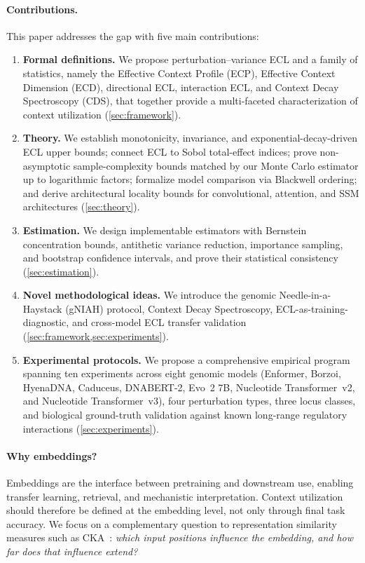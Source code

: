 \paragraph{Contributions.}
This paper addresses the gap with five main contributions:
\begin{enumerate}[leftmargin=2em]
\item \textbf{Formal definitions.} We propose perturbation--variance ECL and a family of statistics, namely the Effective Context Profile (ECP), Effective Context Dimension (ECD), directional ECL, interaction ECL, and Context Decay Spectroscopy (CDS), that together provide a multi-faceted characterization of context utilization (\cref{sec:framework}).
\item \textbf{Theory.} We establish monotonicity, invariance, and exponential-decay-driven ECL upper bounds; connect ECL to Sobol total-effect indices; prove non-asymptotic sample-complexity bounds matched by our Monte Carlo estimator up to logarithmic factors; formalize model comparison via Blackwell ordering; and derive architectural locality bounds for convolutional, attention, and SSM architectures (\cref{sec:theory}).
\item \textbf{Estimation.} We design implementable estimators with Bernstein concentration bounds, antithetic variance reduction, importance sampling, and bootstrap confidence intervals, and prove their statistical consistency (\cref{sec:estimation}).
\item \textbf{Novel methodological ideas.} We introduce the genomic Needle-in-a-Haystack (gNIAH) protocol, Context Decay Spectroscopy, ECL-as-training-diagnostic, and cross-model ECL transfer validation (\cref{sec:framework,sec:experiments}).
\item \textbf{Experimental protocols.} We propose a comprehensive empirical program spanning ten experiments across eight genomic models (Enformer, Borzoi, HyenaDNA, Caduceus, DNABERT-2, Evo~2 7B, Nucleotide Transformer~v2, and Nucleotide Transformer~v3), four perturbation types, three locus classes, and biological ground-truth validation against known long-range regulatory interactions (\cref{sec:experiments}).
\end{enumerate}

\paragraph{Why embeddings?}
Embeddings are the interface between pretraining and downstream use, enabling transfer learning, retrieval, and mechanistic interpretation. Context utilization should therefore be defined at the embedding level, not only through final task accuracy. We focus on a complementary question to representation similarity measures such as CKA~\citep{Kornblith2019CKA}: \emph{which input positions influence the embedding, and how far does that influence extend?}
